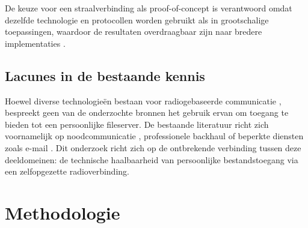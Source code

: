 De keuze voor een straalverbinding als proof-of-concept is verantwoord omdat dezelfde technologie en protocollen worden gebruikt als in grootschalige toepassingen, waardoor de resultaten overdraagbaar zijn naar bredere implementaties \autocite{WirelessBackhaulSurvey}.

\subsection{Lacunes in de bestaande kennis}

Hoewel diverse technologieën bestaan voor radiogebaseerde communicatie \autocite{MaritimeSurvey2022}, bespreekt geen van de onderzochte bronnen het gebruik ervan om toegang te bieden tot een persoonlijke fileserver. De bestaande literatuur richt zich voornamelijk op noodcommunicatie \autocite{WinlinkEmcomm}, professionele backhaul \autocite{MicrowavePtP5G, WirelessBackhaulSurvey} of beperkte diensten zoals e-mail \autocite{WinlinkOverview}. Dit onderzoek richt zich op de ontbrekende verbinding tussen deze deeldomeinen: de technische haalbaarheid van persoonlijke bestandstoegang via een zelfopgezette radioverbinding.

\section{Methodologie}%
\label{sec:methodologie}




